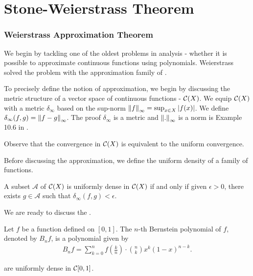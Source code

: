 
\section{Stone-Weierstrass Theorem}
\label{section:appendix:stone-weierstrass}
\subsubsection{Weierstrass Approximation Theorem}

We begin by tackling one of the oldest problems in analysis - whether it is possible to approximate continuous functions using polynomials. Weierstrass solved the problem with the approximation family of . 

To precisely define the notion of approximation, we begin by discussing the metric structure of a vector space of continuous functions - ${\mathcal C}(X)$. We equip ${\mathcal C}(X)$ with a metric $\delta_\infty$ based on the sup-norm $ \left\lVert f\right\rVert_{\infty} = \sup_{x \in X} | f(x) |$. We define $\delta_\infty(f,g) = \left\lVert f - g\right\rVert_{\infty}$. The proof $\delta_\infty$ is a metric and $\left\lVert.\right\rVert_{\infty}$ is a norm is Example 10.6 in \cite{wade_2014_introduction}.

Observe that the convergence in ${\mathcal C}(X)$ is equivalent to the uniform convergence.

Before discussing the approximation, we define the uniform density of a family of functions.

\begin{definition}
A subset $\mathcal{A}$ of ${\mathcal C}(X)$ is uniformly dense in ${\mathcal C}(X)$ if and only if given $\epsilon > 0$, there exists $g \in \mathcal{A}$ such that $\delta_{\infty}(f,g)<\epsilon$.
\end{definition}

We are ready to discuss the .

\begin{definition}
\label{defn:anal:bernstein}
Let $f$ be a function defined on $[0,1]$. The $n$-th Bernstein polynomial of $f$, denoted by $B_n{f}$, is a polynomial given by 
\begin{align*}
    B_n{f} = \sum_{k = 0}^n  f \left(\frac{k}{n}\right) \cdot \binom{n}{k} x^k (1 - x)^{n - k}.
\end{align*}
\end{definition}

\begin{theorem}
\label{thm:anal:bernstein-approx}
 are uniformly dense in ${\mathcal C}[0,1]$.
\end{theorem}

